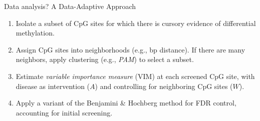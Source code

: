 \documentclass[12pt,t]{beamer}
\begin{document}
\begin{frame}[c]{Data analysis? A Data-Adaptive Approach}

\begin{center}
\begin{enumerate}
  \itemsep8pt
  \item Isolate a subset of CpG sites for which there is cursory evidence of
    differential methylation.
  \item Assign CpG sites into neighborhoods (e.g., bp distance). If there are
    many neighbors, apply clustering (e.g., \textit{PAM}) to select a subset.
  \item Estimate \textit{variable importance measure} (VIM) at each screened CpG
    site, with disease as intervention ($A$) and controlling for neighboring CpG
    sites ($W$).
  \item Apply a variant of the Benjamini \& Hochberg method for FDR control,
    accounting for initial screening.
\end{enumerate}
\end{center}


\end{frame}

\end{document}
